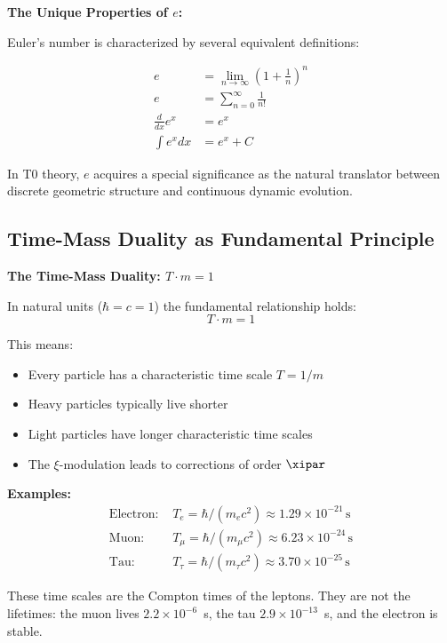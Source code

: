 	\begin{relation}
		\textbf{The Unique Properties of $e$:}
		
		Euler's number is characterized by several equivalent definitions:
		
		\begin{align}
			e &= \lim_{n \to \infty} \left(1 + \frac{1}{n}\right)^n \\
			e &= \sum_{n=0}^{\infty} \frac{1}{n!} \\
			\frac{d}{dx}e^x &= e^x \\
			\int e^x dx &= e^x + C
		\end{align}
		
		In T0 theory, $e$ acquires a special significance as the natural translator between discrete geometric structure and continuous dynamic evolution.
	\end{relation}
	
	\subsection{Time-Mass Duality as Fundamental Principle}
	
	\begin{insight}
		\textbf{The Time-Mass Duality: $T \cdot m = 1$}
		
		In natural units ($\hbar = c = 1$) the fundamental relationship holds:
		\begin{equation}
			\boxed{T \cdot m = 1}
		\end{equation}
		
		This means:
		\begin{itemize}
			\item Every particle has a characteristic time scale $T = 1/m$
			\item Heavy particles typically live shorter
			\item Light particles have longer characteristic time scales
			\item The $\xi$-modulation leads to corrections of order $\xipar$
		\end{itemize}
		
		\textbf{Examples:}
		\begin{align}
			\text{Electron: } & T_e = \hbar/(m_e c^2) \approx 1.29 \times 10^{-21}\, \text{s} \\
			\text{Muon: } & T_\mu = \hbar/(m_\mu c^2) \approx 6.23 \times 10^{-24}\, \text{s} \\
			\text{Tau: } & T_\tau = \hbar/(m_\tau c^2) \approx 3.70 \times 10^{-25}\, \text{s}
		\end{align}
		
		These time scales are the Compton times of the leptons. They are not the lifetimes: the muon lives $2.2 \times 10^{-6}$~s, the tau $2.9 \times 10^{-13}$~s, and the electron is stable.
		
	\end{insight}
	
